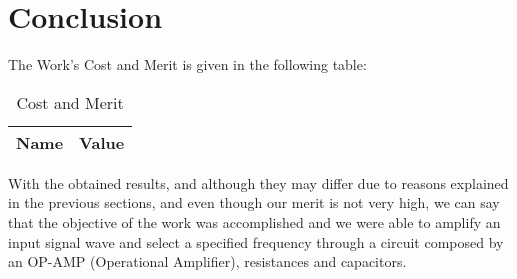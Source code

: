 \section{Conclusion}
\label{sec:conclusion}

The Work's Cost and Merit is given in the following table:

\begin{table}[H]
\centering
\begin{tabular}{|l|l|}
\hline
{\bf Name} & {\bf Value} \\ \hline
    
\end{tabular}
\caption{Cost and Merit}
\end{table}

With the obtained results, and although they may differ due to reasons explained in the previous sections, and even though our merit is not very high, we can say that the objective of the work was accomplished and we were able to amplify an input signal wave and select a specified frequency through a circuit composed by an OP-AMP (Operational Amplifier), resistances and capacitors.
